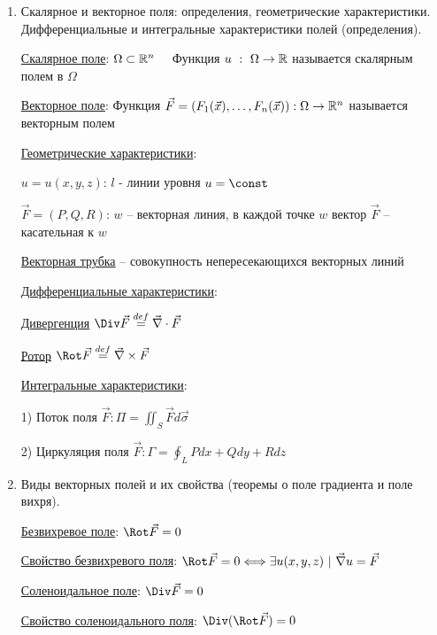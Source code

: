 \documentclass[12pt]{article}
\begin{document}
\begin{enumerate}
        \item Скалярное и векторное поля: определения, геометрические характеристики. Дифференциальные и интегральные характеристики полей (определения).

        \hyperlink{scalarfield}{Скалярное поле}: $\Omega \subset \mathbb{R}^n \quad$ Функция $u \ : \ \Omega \to \mathbb{R}$ называется скалярным полем в $\Omega$

        \hyperlink{vectorfield}{Векторное поле}: Функция $\vec{F} = (F_1(\vec{x}), \dots, F_n(\vec{x})) : \Omega \to \mathbb{R}^n$ называется векторным полем

        \hyperlink{scalarandvectorfieldgeometric}{Геометрические характеристики}:

        $u = u(x, y, z)$: $l$ - линии уровня $u = \const$

        $\vec{F} = (P, Q, R)$: $w$ -- векторная линия, в каждой точке $w$ вектор $\vec{F}$ -- касательная к $w$

        \underline{Векторная трубка} -- совокупность непересекающихся векторных линий

        \hyperlink{differentialcharacteristics}{Дифференциальные характеристики}:

        \hyperlink{divergence}{Дивергенция} $\Div \vec{F} \stackrel{def}{=} \vec\nabla \cdot \vec{F}$

        \hyperlink{rotor}{Ротор} $\Rot \vec{F} \stackrel{def}{=} \vec\nabla \times \vec{F}$

        \hyperlink{integralcharacteristics}{Интегральные характеристики}:

        1) Поток поля $\overrightarrow{F}: \Pi = \iint_S \overrightarrow{F}d\overrightarrow{\sigma}$

        2) Циркуляция поля $\overrightarrow{F}: \Gamma = \oint_L Pdx + Qdy + Rdz$

        \item Виды векторных полей и их свойства (теоремы о поле градиента и поле вихря).

        \hyperlink{vectorfieldtypes}{Безвихревое поле}: $\Rot \vec{F} = 0$

        \hyperlink{irrotationalfieldproperty}{Свойство безвихревого поля}: $\Rot \vec{F} = 0 \Longleftrightarrow \exists u(x, y, z) \ | \ \vec\nabla u = \vec{F}$

        \hyperlink{vectorfieldtypes}{Соленоидальное поле}: $\Div \vec{F} = 0$

        \hyperlink{solenoidalfieldproperty}{Свойство соленоидального поля}: $\Div (\Rot \vec{F}) = 0$


\end{enumerate}
\end{document}

